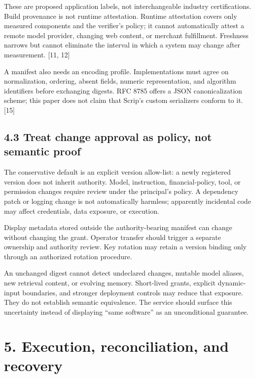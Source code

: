 \documentclass[
  11pt,
  letterpaper,
]{article}
\begin{document}
These are proposed application labels, not interchangeable industry
certifications. Build provenance is not runtime attestation. Runtime
attestation covers only measured components and the verifier's policy;
it cannot automatically attest a remote model provider, changing web
content, or merchant fulfillment. Freshness narrows but cannot eliminate
the interval in which a system may change after measurement. {[}11,
12{]}

A manifest also needs an encoding profile. Implementations must agree on
normalization, ordering, absent fields, numeric representation, and
algorithm identifiers before exchanging digests. RFC 8785 offers a JSON
canonicalization scheme; this paper does not claim that Scrip's custom
serializers conform to it. {[}15{]}

\subsection{4.3 Treat change approval as policy, not semantic
proof}\label{treat-change-approval-as-policy-not-semantic-proof}

The conservative default is an explicit version allow-list: a newly
registered version does not inherit authority. Model, instruction,
financial-policy, tool, or permission changes require review under the
principal's policy. A dependency patch or logging change is not
automatically harmless; apparently incidental code may affect
credentials, data exposure, or execution.

Display metadata stored outside the authority-bearing manifest can
change without changing the grant. Operator transfer should trigger a
separate ownership and authority review. Key rotation may retain a
version binding only through an authorized rotation procedure.

An unchanged digest cannot detect undeclared changes, mutable model
aliases, new retrieval content, or evolving memory. Short-lived grants,
explicit dynamic-input boundaries, and stronger deployment controls may
reduce that exposure. They do not establish semantic equivalence. The
service should surface this uncertainty instead of displaying ``same
software'' as an unconditional guarantee.

\section{5. Execution, reconciliation, and
recovery}\label{execution-reconciliation-and-recovery}
\end{document}
